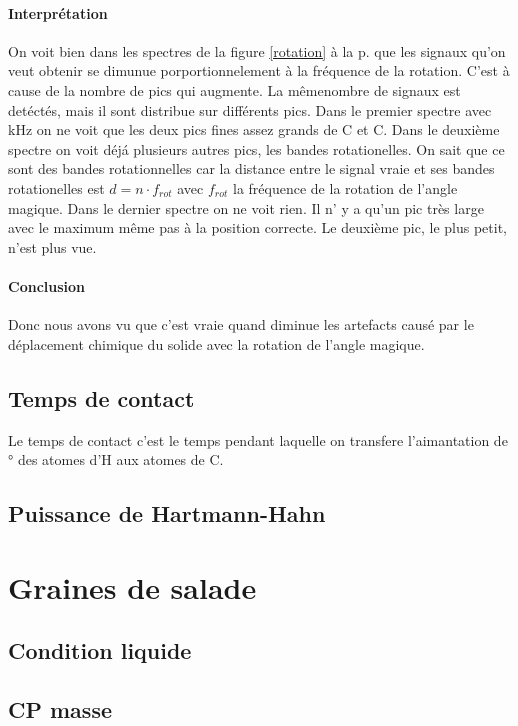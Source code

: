 \documentclass[a4paper,12pt]{scrartcl}
\begin{document}
   \paragraph{Interprétation}
    On voit bien dans les spectres de la figure \ref{rotation} à la p. \pageref{rotation} que les signaux qu'on veut obtenir se dimunue porportionnelement à la fréquence de la rotation. C'est à cause de la nombre de pics qui augmente. La mêmenombre de signaux est detéctés, mais il sont distribue sur différents pics. Dans le premier spectre avec \unit[4]{kHz} on ne voit que les deux pics fines assez grands de  C et C. Dans le deuxième spectre on voit déjá plusieurs autres pics, les bandes rotationelles. On sait que ce sont des bandes rotationnelles car la distance entre le signal vraie et ses bandes rotationelles est $d=n\cdot f_{rot}$ avec $f_{rot}$ la fréquence de la rotation de l'angle magique. Dans le dernier spectre on ne voit rien. Il n' y a qu'un pic très large avec le maximum même pas à la position correcte. Le deuxième pic, le plus petit, n'est plus vue.

   \paragraph{Conclusion}
    Donc nous avons vu que c'est vraie quand diminue les artefacts causé par le déplacement chimique du solide avec la rotation de l'angle magique. 

  \subsection{Temps de contact}
   Le temps de contact c'est le temps pendant laquelle on transfere l'aimantation de \unit[90]{\degree} des atomes d'H aux atomes de C.

  \subsection{Puissance de Hartmann-Hahn}
 
 

 \section{Graines de salade}
  \subsection{Condition liquide}
 
  \subsection{CP masse}
\end{document}
